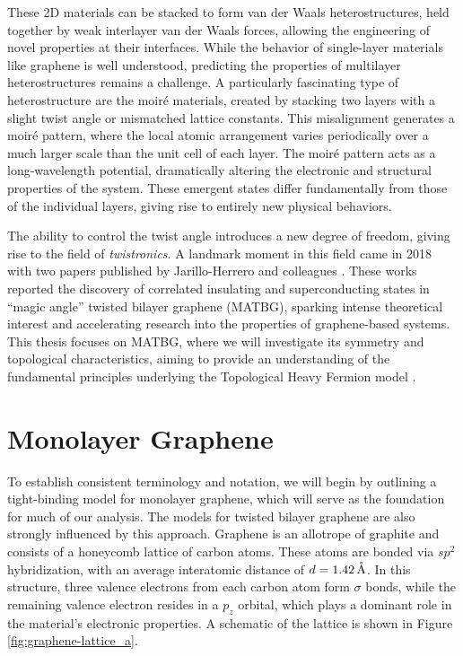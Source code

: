 These 2D materials can be stacked to form van der Waals heterostructures, held together by weak interlayer van der Waals forces, allowing the engineering of novel properties at their interfaces. While the behavior of single-layer materials like graphene is well understood, predicting the properties of multilayer heterostructures remains a challenge. A particularly fascinating type of heterostructure are the moiré materials, created by stacking two layers with a slight twist angle or mismatched lattice constants. This misalignment generates a moiré pattern, where the local atomic arrangement varies periodically over a much larger scale than the unit cell of each layer. The moiré pattern acts as a long-wavelength potential, dramatically altering the electronic and structural properties of the system. These emergent states differ fundamentally from those of the individual layers, giving rise to entirely new physical behaviors.

The ability to control the twist angle introduces a new degree of freedom, giving rise to the field of \textit{twistronics}. A landmark moment in this field came in 2018 with two papers published by Jarillo-Herrero and colleagues \cite{cao2018, cao2018_correlated}. These works reported the discovery of correlated insulating and superconducting states in ``magic angle'' twisted bilayer graphene (MATBG), sparking intense theoretical interest and accelerating research into the properties of graphene-based systems. This thesis focuses on MATBG, where we will investigate its symmetry and topological characteristics, aiming to provide an understanding of the fundamental principles underlying the Topological Heavy Fermion model \cite{topoheavyfermion2022}.

\section{Monolayer Graphene}

To establish consistent terminology and notation, we will begin by outlining a tight-binding model for monolayer graphene, which will serve as the foundation for much of our analysis. The models for twisted bilayer graphene are also strongly influenced by this approach. Graphene is an allotrope of graphite and consists of a honeycomb lattice of carbon atoms. These atoms are bonded via $sp^2$ hybridization, with an average interatomic distance of \( d = 1.42 \, \AA \). In this structure, three valence electrons from each carbon atom form $\sigma$ bonds, while the remaining valence electron resides in a $p_z$ orbital, which plays a dominant role in the material's electronic properties. A schematic of the lattice is shown in Figure \ref{fig:graphene-lattice_a}.

